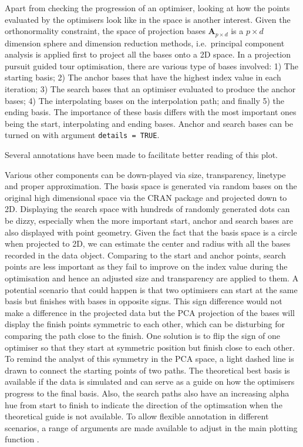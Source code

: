 Apart from checking the progression of an optimiser, looking at how the
points evaluated by the optimisers look like in the space is another
interest. Given the orthonormality constraint, the space of projection
bases \(\mathbf{A}_{p \times d}\) is a \(p \times d\) dimension sphere
and dimension reduction methods, i.e.~principal component analysis is
applied first to project all the bases onto a 2D space. In a projection
pursuit guided tour optimisation, there are various type of bases
involved: 1) The starting basis; 2) The anchor bases that have the
highest index value in each iteration; 3) The search bases that an
optimiser evaluated to produce the anchor bases; 4) The interpolating
bases on the interpolation path; and finally 5) the ending basis. The
importance of these basis differs with the most important ones being the
start, interpolating and ending bases. Anchor and search bases can be
turned on with argument \texttt{details\ =\ TRUE}.

Several annotations have been made to facilitate better reading of this
plot.

Various other components can be down-played via size, transparency,
linetype and proper approximation. The basis space is generated via
random bases on the original high dimensional space via the CRAN package
 \citep{geozoo} and projected down to 2D. Displaying the
search space with hundreds of randomly generated dots can be dizzy,
especially when the more important start, anchor and search bases are
also displayed with point geometry. Given the fact that the basis space
is a circle when projected to 2D, we can estimate the center and radius
with all the bases recorded in the data object. Comparing to the start
and anchor points, search points are less important as they fail to
improve on the index value during the optimisation and hence an adjusted
size and transparency are applied to them. A potential scenario that
could happen is that two optimisers can start at the same basis but
finishes with bases in opposite signs. This sign difference would not
make a difference in the projected data but the PCA projection of the
bases will display the finish points symmetric to each other, which can
be disturbing for comparing the path close to the finish. One solution
is to flip the sign of one optimiser so that they start at symmetric
position but finish close to each other. To remind the analyst of this
symmetry in the PCA space, a light dashed line is drawn to connect the
starting points of two paths. The theoretical best basis is available if
the data is simulated and can serve as a guide on how the optimisers
progress to the final basis. Also, the search paths also have an
increasing alpha hue from start to finish to indicate the direction of
the optimsation when the theoretical guide is not available. To allow
flexible annotation in different scenarios, a range of arguments are
made available to adjust in the main plotting function
.

